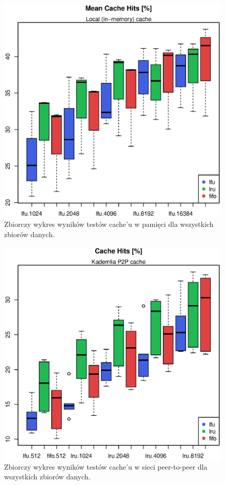 \documentclass[a4paper,11pt]{scrartcl}
\newcommand{\s}{ }
\newcommand{\keszu}{cache'u}
\begin{document}
\begin{figure}[h!]
\centering
\includegraphics[width=0.6\linewidth]{img/tests/nop2p_all.eps}
\caption{Zbiorczy wykres wyników testów \keszu\s w pamięci dla wszystkich zbiorów danych.}
\label{fig_tests_mem_1}
\end{figure}

\begin{figure}[h!]
\centering
\includegraphics[width=0.6\linewidth]{img/tests/p2p_combined_all.eps}
\caption{Zbiorczy wykres wyników testów \keszu\s w sieci peer-to-peer dla wszystkich zbiorów danych.}
\label{fig_tests_p2p_all}
\end{figure}

\end{document}
